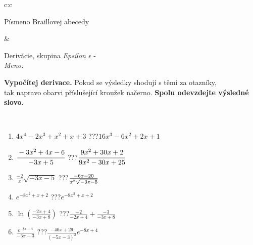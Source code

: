 \documentclass[10pt]{report}
\begin{document}
\begin{tabular}{c:c}
\begin{minipage}[c][104.5mm][t]{0.5\linewidth}
\begin{center}
\begin{minipage}{0.20\linewidth}
\begin{center}
{\small Písmeno Braillovej abecedy}
\end{center}
\end{minipage}
\end{center}
\end{minipage}
&
\begin{minipage}[c][104.5mm][t]{0.5\linewidth}
\begin{center}
\vspace{7mm}
{\huge Derivácie, skupina \textit{Epsilon $\epsilon$} -}\\[5mm]
\textit{Meno:}\phantom{xxxxxxxxxxxxxxxxxxxxxxxxxxxxxxxxxxxxxxxxxxxxxxxxxxxxxxxxxxxxxxxxx}\\[5mm]
\begin{minipage}{0.95\linewidth}
\begin{center}
\textbf{Vypočítej derivace.} Pokud se výsledky shodují s těmi za otazníky,\\tak napravo obarvi příslušející kroužek načerno. \textbf{Spolu odevzdejte výsledné slovo}.
\end{center}
\end{minipage}
\\[1mm]
\begin{minipage}{0.79\linewidth}
\begin{center}
\begin{varwidth}{\linewidth}
\begin{enumerate}
\normalsize
\item $4x^4-2x^3+x^2+x+3$\quad \dotfill\; ???\;\dotfill \quad $16x^3-6x^2+2x+1$
\item $\cfrac{-3x^2+4x-6}{-3x+5}$\quad \dotfill\; ???\;\dotfill \quad $\cfrac{9x^2+30x+2}{9x^2-30x+25}$
\item $\frac{-2}{x}\sqrt{-3x-5}$\quad \dotfill\; ???\;\dotfill \quad $\frac{-6x-20}{x^2 \sqrt{\smash[b]{-3x-5}}}$
\item $e^{-8x^2+x+2}$\quad \dotfill\; ???\;\dotfill \quad $e^{-8x^2+x+2}$
\item $\ln{\left(\frac{-2x+4}{-3x+8}\right)}$\quad \dotfill\; ???\;\dotfill \quad $\frac{-2}{-2x+4}+\frac{-3}{-3x+8}$
\item $\frac{e^{-8x+4}}{-5x-3}$\quad \dotfill\; ???\;\dotfill \quad $\frac{-40x+29}{(-5x-3)^2}e^{-8x+4}$
\end{enumerate}
\end{varwidth}
\end{center}
\end{minipage}
\begin{minipage}{0.20\linewidth}
\begin{center}

\end{center}
\end{minipage}
\end{center}
\end{minipage}
\end{tabular}
\end{document}
